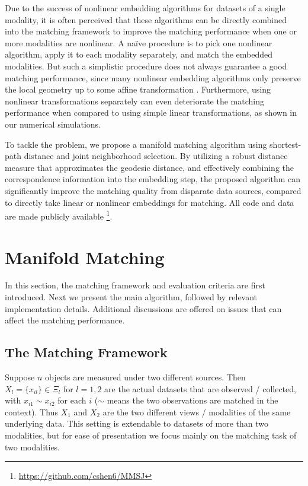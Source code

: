 \documentclass[times,twocolumn,final]{elsarticle}
\begin{document}
Due to the success of nonlinear embedding algorithms for datasets of a single modality, it is often perceived that these algorithms can be directly combined into the matching framework to improve the matching performance when one or more modalities are nonlinear. A na\"ive procedure is to pick one nonlinear algorithm, apply it to each modality separately, and match the embedded modalities. But such a simplistic procedure does not always guarantee a good matching performance, since many nonlinear embedding algorithms only preserve the local geometry up to some affine transformation \citep{GoldbergRitov2008}. Furthermore, using nonlinear transformations separately can even deteriorate the matching performance when compared to using simple linear transformations, as shown in our numerical simulations.

To tackle the problem, we propose a manifold matching algorithm using shortest-path distance and joint neighborhood selection. By utilizing a robust distance measure that approximates the geodesic distance, and effectively combining the correspondence information into the embedding step, the proposed algorithm can significantly improve the matching quality from disparate data sources, compared to directly take linear or nonlinear embeddings for matching. All code and data are made publicly available \footnote{\url{https://github.com/cshen6/MMSJ}}.

\section{Manifold Matching}
\label{main}

In this section, the matching framework and evaluation criteria are first introduced. Next we present the main algorithm, followed by relevant implementation details. Additional discussions are offered on issues that can affect the matching performance.

\subsection{The Matching Framework}
\label{bg}
Suppose $n$ objects are measured under two different sources. Then $X_{l}=\{x_{il}\} \in \Xi_{l}$ for $l=1, 2$ are the actual datasets that are observed / collected, with $x_{i1} \sim x_{i2}$ for each $i$ ($\sim$ means the two observations are matched in the context). Thus $X_{1}$ and $X_{2}$ are the two different views / modalities of the same underlying data. This setting is extendable to datasets of more than two modalities, but for ease of presentation we focus mainly on the matching task of two modalities.
\end{document}
